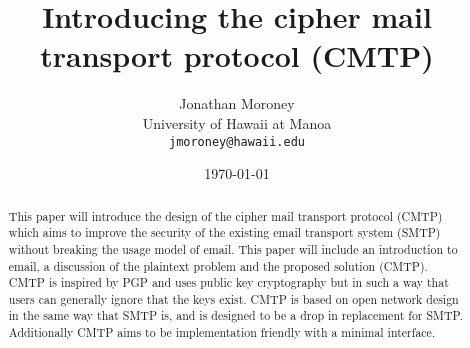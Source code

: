 \documentclass[a4paper,11pt]{article}
\begin{document}
\title{Introducing the cipher mail transport protocol (CMTP)}
\author{Jonathan Moroney\\
University of Hawaii at Manoa\\
\texttt{jmoroney@hawaii.edu}}
\date{\today}

\maketitle
\tableofcontents

\begin{abstract}
This paper will introduce the design of the cipher mail transport protocol (CMTP) which aims to improve the security of the existing email transport system (SMTP) without breaking the usage model of email. This paper will include an introduction to email, a discussion of the plaintext problem and the proposed solution (CMTP). CMTP is inspired by PGP and uses public key cryptography but in such a way that users can generally ignore that the keys exist. CMTP is based on open network design in the same way that SMTP is, and is designed to be a drop in replacement for SMTP. Additionally CMTP aims to be implementation friendly with a minimal interface.
\end{abstract}



\end{document}
